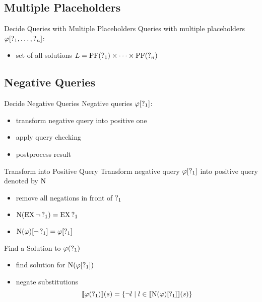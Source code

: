 \subsection{Multiple Placeholders}%

\begin{frame}{Decide Queries with Multiple Placeholders}
  Queries with multiple placeholders $\varphi[\operatorname{?}_1,\ldots,\operatorname{?}_n]$:
  \begin{itemize}
    \item set of all solutions $L = \operatorname{PF}(\operatorname{?}_1)\times \cdots \times \operatorname{PF}(\operatorname{?}_n)$
  \end{itemize}
\end{frame}




\subsection{Negative Queries}%

\begin{frame}{Decide Negative Queries}
  Negative queries $\varphi[\operatorname{?}_1]$:
  \begin{itemize}
    \item transform negative query into positive one
    \item apply query checking
    \item postprocess result
  \end{itemize}
\end{frame}

\begin{frame}{Transform into Positive Query}
  Transform negative query $\varphi[\operatorname{?}_1]$ into positive query denoted by $\operatorname{N}$
  \begin{itemize}
    \item remove all negations in front of $\operatorname{?}_{1}$
    \item $\operatorname{N}(\operatorname{EX} \lnot \operatorname{?}_1) = \operatorname{EX} \operatorname{?}_{1}$
    \item $\operatorname{N}(\varphi)[\lnot\operatorname{?}_1] = \varphi[\operatorname{?}_1]$
  \end{itemize}
\end{frame}

\begin{frame}{Find a Solution to $\varphi(\operatorname{?}_1)$}
  \begin{itemize}
    \item find solution for $\operatorname{N}(\varphi[\operatorname{?}_1])$
    \item negate substitutions \\
      \[
        \llbracket \varphi(\operatorname{?}_1) \rrbracket (s) = \{ \lnot l \mid l \in 
          \llbracket \operatorname{N}(\varphi)[\operatorname{?}_1] \rrbracket (s) \}
      \]
  \end{itemize}
\end{frame}



